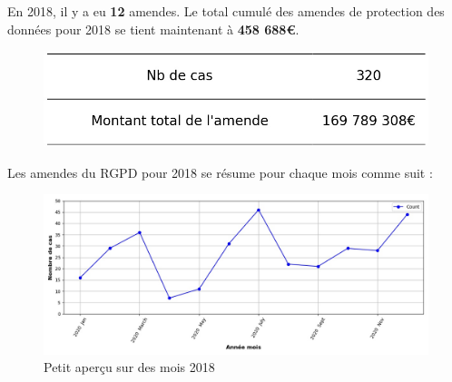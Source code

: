 \documentclass[french]{article}
\begin{document}
\newpage




	\begin{multicols}{2}
	
	En 2018,  il y a eu \textbf{12} amendes.
	Le total cumulé des amendes de protection des données pour 2018 se tient maintenant à \textbf{458 688€}.
	
	\begin{figure}[H]
	\centering\includegraphics[width=1\linewidth]{graphs/counter_year}
	\end{figure}


	Les amendes du RGPD pour 2018 se résume pour chaque mois comme suit :

	\begin{figure}
	[H]\centering\includegraphics[width = 1.2\linewidth]{graphs/NbFinesPerMonth_year_graph}
	\caption{Petit aperçu sur des mois 2018}
	\end{figure}

	\end{multicols}
\end{document}
